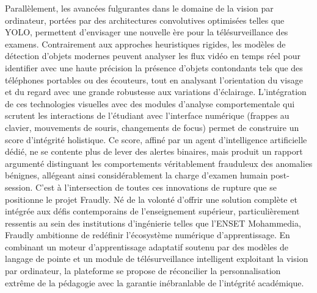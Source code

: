 Parallèlement, les avancées fulgurantes dans le domaine de la vision par ordinateur, portées par des architectures convolutives optimisées telles que YOLO, permettent d'envisager une nouvelle ère pour la télésurveillance des examens. Contrairement aux approches heuristiques rigides, les modèles de détection d'objets modernes peuvent analyser les flux vidéo en temps réel pour identifier avec une haute précision la présence d'objets contondants tels que des téléphones portables ou des écouteurs, tout en analysant l'orientation du visage et du regard avec une grande robustesse aux variations d'éclairage. L'intégration de ces technologies visuelles avec des modules d'analyse comportementale qui scrutent les interactions de l'étudiant avec l'interface numérique (frappes au clavier, mouvements de souris, changements de focus) permet de construire un score d'intégrité holistique. Ce score, affiné par un agent d'intelligence artificielle dédié, ne se contente plus de lever des alertes binaires, mais produit un rapport argumenté distinguant les comportements véritablement frauduleux des anomalies bénignes, allégeant ainsi considérablement la charge d'examen humain post-session. C'est à l'intersection de toutes ces innovations de rupture que se positionne le projet Fraudly. Né de la volonté d'offrir une solution complète et intégrée aux défis contemporains de l'enseignement supérieur, particulièrement ressentis au sein des institutions d'ingénierie telles que l'ENSET Mohammedia, Fraudly ambitionne de redéfinir l'écosystème numérique d'apprentissage. En combinant un moteur d'apprentissage adaptatif soutenu par des modèles de langage de pointe et un module de télésurveillance intelligent exploitant la vision par ordinateur, la plateforme se propose de réconcilier la personnalisation extrême de la pédagogie avec la garantie inébranlable de l'intégrité académique.

